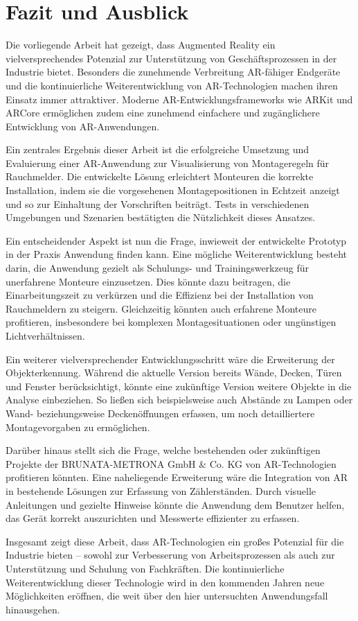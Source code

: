 \chapter{Fazit und Ausblick}

Die vorliegende Arbeit hat gezeigt, dass Augmented Reality ein vielversprechendes Potenzial zur Unterstützung von Geschäftsprozessen in der Industrie bietet. Besonders die zunehmende Verbreitung AR-fähiger Endgeräte und die kontinuierliche Weiterentwicklung von AR-Technologien machen ihren Einsatz immer attraktiver. Moderne AR-Entwicklungsframeworks wie ARKit und ARCore ermöglichen zudem eine zunehmend einfachere und zugänglichere Entwicklung von AR-Anwendungen.

Ein zentrales Ergebnis dieser Arbeit ist die erfolgreiche Umsetzung und Evaluierung einer AR-Anwendung zur Visualisierung von Montageregeln für Rauchmelder. Die entwickelte Lösung erleichtert Monteuren die korrekte Installation, indem sie die vorgesehenen Montagepositionen in Echtzeit anzeigt und so zur Einhaltung der Vorschriften beiträgt. Tests in verschiedenen Umgebungen und Szenarien bestätigten die Nützlichkeit dieses Ansatzes.

Ein entscheidender Aspekt ist nun die Frage, inwieweit der entwickelte Prototyp in der Praxis Anwendung finden kann. Eine mögliche Weiterentwicklung besteht darin, die Anwendung gezielt als Schulungs- und Trainingswerkzeug für unerfahrene Monteure einzusetzen. Dies könnte dazu beitragen, die Einarbeitungszeit zu verkürzen und die Effizienz bei der Installation von Rauchmeldern zu steigern. Gleichzeitig könnten auch erfahrene Monteure profitieren, insbesondere bei komplexen Montagesituationen oder ungünstigen Lichtverhältnissen.

Ein weiterer vielversprechender Entwicklungsschritt wäre die Erweiterung der Objekterkennung. Während die aktuelle Version bereits Wände, Decken, Türen und Fenster berücksichtigt, könnte eine zukünftige Version weitere Objekte in die Analyse einbeziehen. So ließen sich beispielsweise auch Abstände zu Lampen oder Wand- beziehungsweise Deckenöffnungen erfassen, um noch detailliertere Montagevorgaben zu ermöglichen.

Darüber hinaus stellt sich die Frage, welche bestehenden oder zukünftigen Projekte der BRUNATA-METRONA GmbH \& Co. KG von AR-Technologien profitieren könnten. Eine naheliegende Erweiterung wäre die Integration von AR in bestehende Lösungen zur Erfassung von Zählerständen. Durch visuelle Anleitungen und gezielte Hinweise könnte die Anwendung dem Benutzer helfen, das Gerät korrekt auszurichten und Messwerte effizienter zu erfassen.

Insgesamt zeigt diese Arbeit, dass AR-Technologien ein großes Potenzial für die Industrie bieten – sowohl zur Verbesserung von Arbeitsprozessen als auch zur Unterstützung und Schulung von Fachkräften. Die kontinuierliche Weiterentwicklung dieser Technologie wird in den kommenden Jahren neue Möglichkeiten eröffnen, die weit über den hier untersuchten Anwendungsfall hinausgehen.